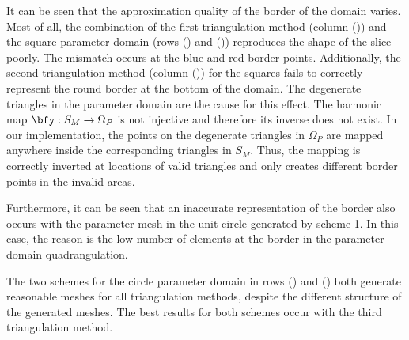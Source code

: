 It can be seen that the approximation quality of the border of the domain varies. Most of all, the combination of the first triangulation method (column ()) and the square parameter domain (rows () and ()) reproduces the shape of the slice poorly. 
The mismatch occurs at the blue and red border points. Additionally, the second triangulation method (column ()) for the squares fails to correctly represent the round border at the bottom of the domain.
The degenerate triangles in the parameter domain are the cause for this effect. The harmonic map $\bfy: S_M \to \Omega_P$ is not injective and therefore its inverse does not exist. In our implementation, the points on the degenerate triangles in $\Omega_P$ are mapped anywhere inside the corresponding triangles in $S_M$. Thus, the mapping is correctly inverted at locations of valid triangles and only creates different border points in the invalid areas.


Furthermore, it can be seen that an inaccurate representation of the border also occurs with the parameter mesh in the unit circle generated by scheme 1. In this case, the reason is the low number of elements at the border in the parameter domain quadrangulation.

The two schemes for the circle parameter domain in rows () and () both generate reasonable meshes for all triangulation methods, despite the different structure of the generated meshes. The best results for both schemes occur with the third triangulation method.

